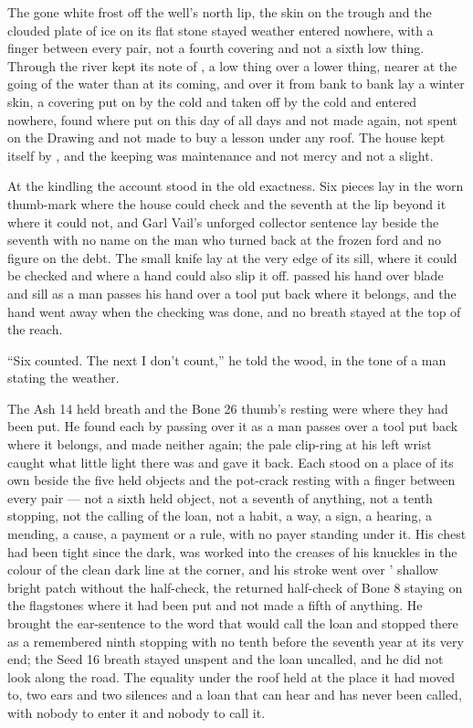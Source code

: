 The gone white frost off the well's north lip, the skin on the trough and the clouded plate of ice on its flat stone stayed weather entered nowhere, with a finger between every pair, not a fourth covering and not a sixth low thing. Through  the river kept its note of , a low thing over a lower thing, nearer at the going of the water than at its coming, and over it from bank to bank lay a winter skin, a covering put on by the cold and taken off by the cold and entered nowhere, found where put on this day of all days and not made again, not spent on the Drawing and not made to buy a lesson under any roof. The house kept itself by , and the keeping was maintenance and not mercy and not a slight.

\scenebreak

At the kindling the account stood in the old exactness. Six pieces lay in the worn thumb-mark where the house could check and the seventh at the lip beyond it where it could not, and Garl Vail's unforged collector sentence lay beside the seventh with no name on the man who turned back at the frozen ford and no figure on the debt. The small knife lay at the very edge of its sill, where it could be checked and where a hand could also slip it off.  passed his hand over blade and sill as a man passes his hand over a tool put back where it belongs, and the hand went away when the checking was done, and no breath stayed at the top of the reach.

“Six counted. The next I don't count,” he told the wood, in the tone of a man stating the weather.

The Ash 14 held breath and the Bone 26 thumb's resting were where they had been put. He found each by passing over it as a man passes over a tool put back where it belongs, and made neither again; the pale clip-ring at his left wrist caught what little light there was and gave it back. Each stood on a place of its own beside the five held objects and the pot-crack resting with a finger between every pair --- not a sixth held object, not a seventh of anything, not a tenth stopping, not the calling of the loan, not a habit, a way, a sign, a hearing, a mending, a cause, a payment or a rule, with no payer standing under it. His chest had been tight since the dark,  was worked into the creases of his knuckles in the colour of the clean dark line at the corner, and his stroke went over ' shallow bright patch without the half-check, the returned half-check of Bone 8 staying on the flagstones where it had been put and not made a fifth of anything. He brought the ear-sentence to the word that would call the loan and stopped there as a remembered ninth stopping with no tenth before the seventh year at its very end; the Seed 16 breath stayed unspent and the loan uncalled, and he did not look along the road. The equality under the roof held at the place it had moved to, two ears and two silences and a loan that can hear and has never been called, with nobody to enter it and nobody to call it.

